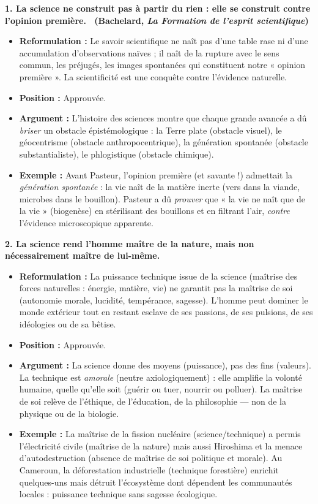 \documentclass[11pt]{article}
\newcommand{\cle}[1]{{\popxbold\color{popdark}#1}}
\begin{document}
\begin{corrige}
\textbf{1. \guillemotleft La science ne construit pas à partir du rien : elle se construit contre l'opinion première. \guillemotright\ (Bachelard, \emph{La Formation de l'esprit scientifique})}
\begin{itemize}
\item \textbf{Reformulation :} Le savoir scientifique ne naît pas d'une table rase ni d'une accumulation d'observations naïves ; il naît de la \cle{rupture} avec le \cle{sens commun}, les \cle{préjugés}, les \cle{images spontanées} qui constituent notre « opinion première ». La scientificité est une \cle{conquête} contre l'évidence naturelle.
\item \textbf{Position :} Approuvée.
\item \textbf{Argument :} L'histoire des sciences montre que chaque grande avancée a dû \emph{briser} un obstacle épistémologique : la Terre plate (obstacle visuel), le géocentrisme (obstacle anthropocentrique), la génération spontanée (obstacle substantialiste), le phlogistique (obstacle chimique).
\item \textbf{Exemple :} Avant Pasteur, l'opinion première (et savante !) admettait la \emph{génération spontanée} : la vie naît de la matière inerte (vers dans la viande, microbes dans le bouillon). Pasteur a dû \emph{prouver} que « la vie ne naît que de la vie » (biogenèse) en stérilisant des bouillons et en filtrant l'air, \emph{contre} l'évidence microscopique apparente.
\end{itemize}

\textbf{2. La science rend l'homme maître de la nature, mais non nécessairement maître de lui-même.}
\begin{itemize}
\item \textbf{Reformulation :} La puissance technique issue de la science (maîtrise des forces naturelles : énergie, matière, vie) ne garantit pas la \cle{maîtrise de soi} (autonomie morale, lucidité, tempérance, sagesse). L'homme peut dominer le monde extérieur tout en restant esclave de ses passions, de ses pulsions, de ses idéologies ou de sa bêtise.
\item \textbf{Position :} Approuvée.
\item \textbf{Argument :} La science donne des \cle{moyens} (puissance), pas des \cle{fins} (valeurs). La technique est \emph{amorale} (neutre axiologiquement) : elle amplifie la volonté humaine, quelle qu'elle soit (guérir ou tuer, nourrir ou polluer). La maîtrise de soi relève de l'\cle{éthique}, de l'\cle{éducation}, de la \cle{philosophie} — non de la physique ou de la biologie.
\item \textbf{Exemple :} La maîtrise de la fission nucléaire (science/technique) a permis l'électricité civile (maîtrise de la nature) mais aussi Hiroshima et la menace d'autodestruction (absence de maîtrise de soi politique et morale). Au Cameroun, la déforestation industrielle (technique forestière) enrichit quelques-uns mais détruit l'écosystème dont dépendent les communautés locales : puissance technique sans sagesse écologique.
\end{itemize}


\end{corrige}
\end{document}
